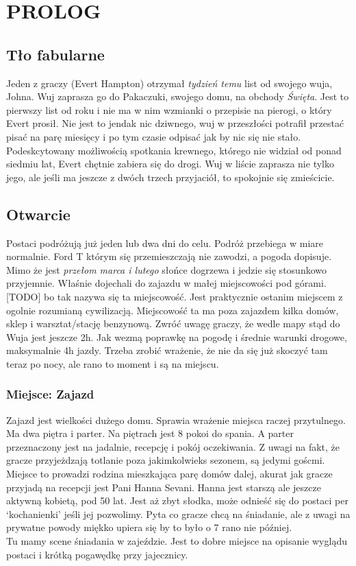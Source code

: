 \documentclass[ms,a4paper]{memoir}
\newcommand{\RED}[1]{\textcolor{red!50!black}{\MakeUppercase{#1}}}
\begin{document}
\chapter{\RED{Prolog}}
\section{Tło fabularne}
Jeden z graczy (Evert Hampton) otrzymał \emph{tydzień temu} list od swojego wuja, Johna.
Wuj zaprasza go do Pakaczuki, swojego domu, na obchody \emph{Święta}.
Jest to pierwszy list od roku i nie ma w nim wzmianki o przepisie na pierogi, o który Evert prosił.
Nie jest to jendak nic dziwnego, wuj w przeszłości potrafił przestać pisać na parę miesięcy i po tym czasie odpisać jak by nic się nie stało.
Podeskcytowany możliwością spotkania krewnego, którego nie widział od ponad
siedmiu lat, Evert chętnie zabiera się do drogi.
Wuj w liście zaprasza nie tylko jego, ale jeśli ma jeszcze z dwóch trzech przyjaciół, to spokojnie się zmieścicie.


\section{Otwarcie}
Postaci podróżują już jeden lub dwa dni do celu.
Podróż przebiega w miare normalnie. Ford T którym się przemieszczają nie zawodzi, a pogoda
dopisuje. Mimo że jest \emph{przełom marca i lutego} słońce dogrzewa i jedzie się stosunkowo
przyjemnie. Właśnie dojechali do zajazdu w małej
miejscowości pod górami. [TODO] bo tak nazywa się ta miejscowość. Jest praktycznie ostanim miejscem z ogolnie rozumianą cywilizacją.
Miejscowość ta ma poza zajazdem kilka domów, sklep i warsztat/stację benzynową.
Zwróć uwagę graczy, że wedle mapy stąd do Wuja jest jeszcze 2h.
Jak wezmą poprawkę na pogodę i średnie warunki drogowe, maksymalnie 4h jazdy.
Trzeba zrobić wrażenie, że nie da się już skoczyć tam teraz po nocy, ale rano to moment i są na miejscu.

\subsection{Miejsce: Zajazd}
Zajazd jest wielkości dużego domu.
Sprawia wrażenie miejsca raczej przytulnego.
Ma dwa piętra i parter.
Na piętrach jest 8 pokoi do spania.
A parter przeznaczony jest na jadalnie, recepcję i pokój oczekiwania.
Z uwagi na fakt, że gracze przyjeżdzają totlanie poza jakimkolwieks sezonem, są jedymi goścmi.
Miejsce to prowadzi rodzina mieszkająca parę domów dalej, akurat jak gracze przyjadą na recepcji
jest Pani Hanna Sevani.
Hanna jest starszą ale jeszcze aktywną kobietą, pod 50 lat.
Jest aż zbyt słodka, może odnieść się do postaci per `kochanienki' jeśli jej pozwolimy.
Pyta co gracze chcą na śniadanie, ale z uwagi na prywatne powody miękko upiera się by to było o 7 rano nie później.
\\
Tu mamy scene śniadania w zajeździe.
Jest to dobre miejsce na opisanie wyglądu postaci i krótką pogawędkę przy jajecznicy.
\end{document}
